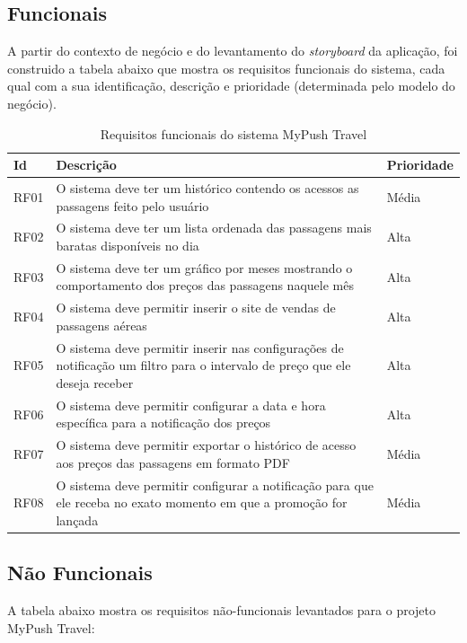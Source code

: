\subsection{Funcionais}

A partir do contexto de negócio e do levantamento do \textit{storyboard} da aplicação, foi construido a tabela abaixo que mostra os requisitos funcionais do sistema, cada qual com a sua identificação, descrição e prioridade (determinada pelo modelo do negócio).

\begin{table}[h]
	\centering
	\begin{tabular}{p{3cm}|p{7cm}|p{4cm}}
		\toprule
			\textbf{Id} & \textbf{Descrição} & \textbf{Prioridade} \\ \hline
		\midrule
			RF01 & O sistema deve ter um histórico contendo os acessos as passagens feito pelo usuário & Média \\ \hline
			RF02 & O sistema deve ter um lista ordenada das passagens mais baratas disponíveis no dia & Alta \\ \hline
			RF03 & O sistema deve ter um gráfico por meses mostrando o comportamento dos preços das passagens naquele mês & Alta \\ \hline
			RF04 & O sistema deve permitir inserir o site de vendas de passagens aéreas & Alta \\ \hline
			RF05 & O sistema deve permitir inserir nas configurações de notificação um filtro para o intervalo de preço que ele deseja receber & Alta \\ \hline
			RF06 & O sistema deve permitir configurar a data e hora específica para a notificação dos preços & Alta \\ \hline
			RF07 & O sistema deve permitir exportar o histórico de acesso aos preços das passagens em formato PDF & Média \\ \hline
			RF08 & O sistema deve permitir configurar a notificação para que ele receba no exato momento em que a promoção for lançada & Média \\ \hline
		\bottomrule
	\end{tabular}
	\caption{Requisitos funcionais do sistema MyPush Travel}
	\label{tab01}
\end{table}

\subsection{Não Funcionais}

A tabela abaixo mostra os requisitos não-funcionais levantados para o projeto MyPush Travel:

